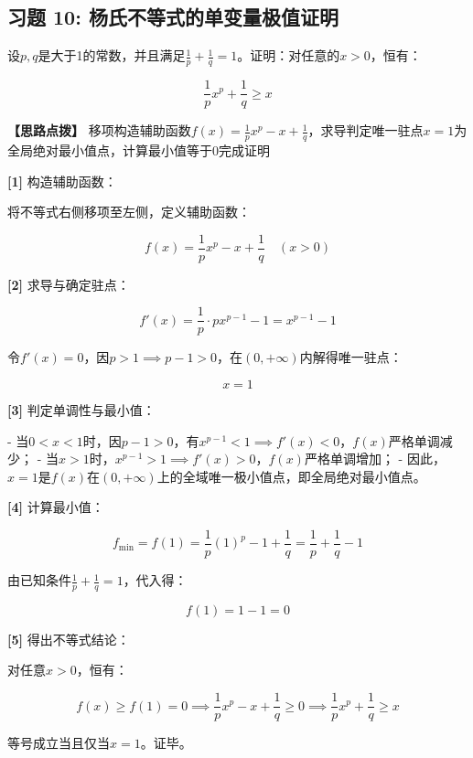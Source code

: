 \documentclass[11pt,a4paper,UTF8]{ctexart}
\begin{document}
\subsection{习题 10: 杨氏不等式的单变量极值证明}

设$p, q$是大于1的常数，并且满足$\frac{1}{p} + \frac{1}{q} = 1$。证明：对任意的$x > 0$，恒有：


\begin{equation*}
\frac{1}{p}x^p + \frac{1}{q} \ge x
\end{equation*}

\textbf{\color{DeepPurple}【思路点拨】} 移项构造辅助函数$f(x) = \frac{1}{p}x^p - x + \frac{1}{q}$，求导判定唯一驻点$x = 1$为全局绝对最小值点，计算最小值等于0完成证明


\begin{solbox}[分步推导与答题规范]
\textbf{[1]} 构造辅助函数：

将不等式右侧移项至左侧，定义辅助函数：


\begin{equation*}
f(x) = \frac{1}{p}x^p - x + \frac{1}{q} \quad (x > 0)
\end{equation*}


\textbf{[2]} 求导与确定驻点：


\begin{equation*}
f'(x) = \frac{1}{p} \cdot p x^{p-1} - 1 = x^{p-1} - 1
\end{equation*}


令$f'(x) = 0$，因$p > 1 \implies p - 1 > 0$，在$(0, +\infty)$内解得唯一驻点：


\begin{equation*}
x = 1
\end{equation*}


\textbf{[3]} 判定单调性与最小值：

- 当$0 < x < 1$时，因$p - 1 > 0$，有$x^{p-1} < 1 \implies f'(x) < 0$，$f(x)$严格单调减少；
- 当$x > 1$时，$x^{p-1} > 1 \implies f'(x) > 0$，$f(x)$严格单调增加；
- 因此，$x = 1$是$f(x)$在$(0, +\infty)$上的全域唯一极小值点，即全局绝对最小值点。

\textbf{[4]} 计算最小值：


\begin{equation*}
f_{\min} = f(1) = \frac{1}{p}(1)^p - 1 + \frac{1}{q} = \frac{1}{p} + \frac{1}{q} - 1
\end{equation*}


由已知条件$\frac{1}{p} + \frac{1}{q} = 1$，代入得：


\begin{equation*}
f(1) = 1 - 1 = 0
\end{equation*}


\textbf{[5]} 得出不等式结论：

对任意$x > 0$，恒有：


\begin{equation*}
f(x) \ge f(1) = 0 \implies \frac{1}{p}x^p - x + \frac{1}{q} \ge 0 \implies \frac{1}{p}x^p + \frac{1}{q} \ge x
\end{equation*}


等号成立当且仅当$x = 1$。证毕。
\end{solbox}
\end{document}
